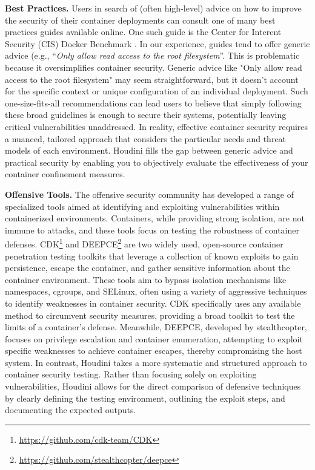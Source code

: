 \noindent\textbf{Best Practices.} Users in search of (often high-level) advice on how to improve the security of their container deployments can consult one of many best practices guides available online. One such guide is the Center for Interent Security (CIS) Docker Benchmark \cite{CIS}. In our experience, guides tend to offer generic advice (e.g., ``\textit{Only allow read access to the root filesystem}''. This is problematic because it oversimplifies container security. Generic advice like "Only allow read access to the root filesystem" may seem straightforward, but it doesn't account for the specific context or unique configuration of an individual deployment. Such one-size-fits-all recommendations can lead users to believe that simply following these broad guidelines is enough to secure their systems, potentially leaving critical vulnerabilities unaddressed. In reality, effective container security requires a nuanced, tailored approach that considers the particular needs and threat models of each environment. Houdini fills the gap between generic advice and practical security by enabling you to objectively evaluate the effectiveness of your container confinement measures.

\noindent\textbf{Offensive Tools.} The offensive security community has developed a range of specialized tools aimed at identifying and exploiting vulnerabilities within containerized environments. Containers, while providing strong isolation, are not immune to attacks, and these tools focus on testing the robustness of container defenses. CDK\footnote{\url{https://github.com/cdk-team/CDK}} and DEEPCE\footnote{\url{https://github.com/stealthcopter/deepce}} are two widely used, open-source container penetration testing toolkits that leverage a collection of known exploits to gain persistence, escape the container, and gather sensitive information about the container environment. These tools aim to bypass isolation mechanisms like namespaces, cgroups, and SELinux, often using a variety of aggressive techniques to identify weaknesses in container security. CDK specifically uses any available method to circumvent security measures, providing a broad toolkit to test the limits of a container’s defense. Meanwhile, DEEPCE, developed by stealthcopter, focuses on privilege escalation and container enumeration, attempting to exploit specific weaknesses to achieve container escapes, thereby compromising the host system. In contrast, Houdini takes a more systematic and structured approach to container security testing. Rather than focusing solely on exploiting vulnerabilities, Houdini allows for the direct comparison of defensive techniques by clearly defining the testing environment, outlining the exploit steps, and documenting the expected outputs.

